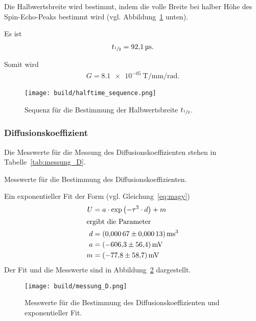 Die Halbwertsbreite wird bestimmt, indem die volle Breite bei halber Höhe des Spin-Echo-Peaks bestimmt wird (vgl. Abbildung~\ref{fig:halftime_sequence} unten).

Es ist
\begin{align}%
  \label{eq:t_1/2}
  t_{\sfrac{1}{2}} = \SI{92.1}{\micro\second}.
\end{align}

Somit wird
\begin{align}%
  \label{eq:g}
  G = \SI[]{8.1e-05}{\tesla\per\milli\meter\per\radian}.
\end{align}



\begin{figure}[ht]
  \centering
  \texttt{[image: build/halftime\_sequence.png]}
  \caption{Sequenz für die Bestimmung der Halbwertsbreite $t_{\sfrac{1}{2}}$.}%
  \label{fig:halftime_sequence}
\end{figure}


\subsubsection{Diffusionskoeffizient}%
\label{sub:diffusionskoeefizient}
Die Messwerte für die Messung des Diffusionskoeffizienten stehen in Tabelle~\ref{tab:messung_D}.

\begin{table}[ht]
  \centering
  \caption{Messwerte für die Bestimmung des Diffusionskoeffizienten.}%
  \label{tab:messung_D}
  
\end{table}

Ein exponentieller Fit der Form (vgl. Gleichung~\eqref{eq:magy})
\begin{align*}
  U &= a \cdot \exp{\left(- \tau^3 \cdot d\right)} + m \\
  \intertext{ergibt die Parameter}
  d &= \SI{0.00067 \pm 0.00013}{\milli\second\tothe3} \\
  a &= \SI{-606.3 \pm 56.4}{\milli\volt} \\
  m &= \SI{-77.8 \pm 58.7}{\milli\volt}
\end{align*}
Der Fit und die Messwerte sind in Abbildung~\ref{fig:messung_D} dargestellt.

\begin{figure}[ht]
  \centering
  \texttt{[image: build/messung\_D.png]}
  \caption{Messwerte für die Bestimmung des Diffusionskoeffizienten und exponentieller Fit.}%
  \label{fig:messung_D}
\end{figure}

